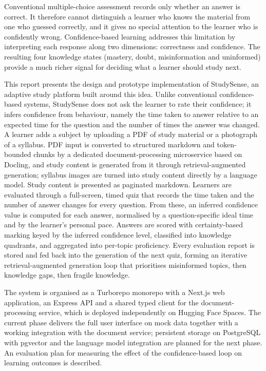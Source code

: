 \documentclass[12pt,a4paper,oneside]{report}
\begin{document}
Conventional multiple-choice assessment records only whether an answer is
correct. It therefore cannot distinguish a learner who knows the material
from one who guessed correctly, and it gives no special attention to the
learner who is confidently wrong. Confidence-based learning addresses this
limitation by interpreting each response along two dimensions: correctness
and confidence. The resulting four knowledge states (mastery, doubt,
misinformation and uninformed) provide a much richer signal for deciding
what a learner should study next.

This report presents the design and prototype implementation of
StudySense, an adaptive study platform built around this idea. Unlike
conventional confidence-based systems, StudySense does not ask the learner
to rate their confidence; it infers confidence from behaviour, namely the
time taken to answer relative to an expected time for the question and the
number of times the answer was changed. A learner adds a subject by
uploading a PDF of study material or a photograph of a syllabus. PDF input
is converted to structured markdown and token-bounded chunks by a
dedicated document-processing microservice based on Docling, and study
content is generated from it through retrieval-augmented generation;
syllabus images are turned into study content directly by a language
model. Study content is presented as paginated markdown. Learners are
evaluated through a full-screen, timed quiz that records the time taken
and the number of answer changes for every question. From these, an
inferred confidence value is computed for each answer, normalised by a
question-specific ideal time and by the learner's personal pace. Answers
are scored with certainty-based marking keyed by the inferred confidence
level, classified into knowledge
quadrants, and aggregated into per-topic proficiency. Every evaluation
report is stored and fed back into the generation of the next quiz, forming
an iterative retrieval-augmented generation loop that prioritises
misinformed topics, then knowledge gaps, then fragile knowledge.

The system is organised as a Turborepo monorepo with a Next.js web
application, an Express API and a shared typed client for the
document-processing service, which is deployed independently on Hugging
Face Spaces. The current phase delivers the full user interface on mock
data together with a working integration with the document service;
persistent storage on PostgreSQL with pgvector and the language model
integration are planned for the next phase. An evaluation plan for
measuring the effect of the confidence-based loop on learning outcomes is
described.
\end{document}
